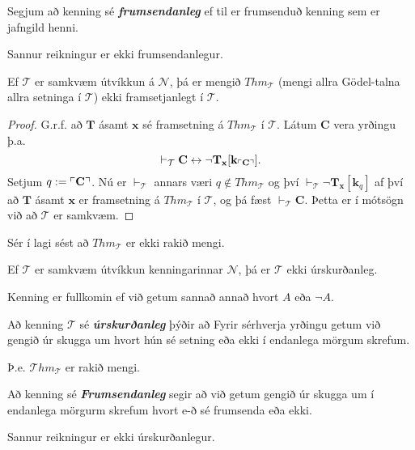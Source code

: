 \documentclass[12pt]{book}
\newcommand{\cT}{\mathcal{T}}
\newcommand{\cN}{\mathcal{N}}
\newcommand{\mc}[1]{\mathcal{#1}}
\newcommand{\bC}{\mathbf{C}}
\newcommand{\bT}{\mathbf{T}}
\newcommand{\bx}{\mathbf{x}}
\newcommand{\bk}{\mathbf{k}}
\newcommand{\Thm}{{\mc{T}hm}}
\newcommand{\vT}{\vdash_{\cT}}
\newcommand{\thT}{Thm_{\cT}}
\newcommand{\emphs}[1]{\textbf{\emph{#1}}}
\DeclarePairedDelimiter{\god}{\ulcorner}{\urcorner}
\begin{document}
\begin{skgr}
  Segjum að kenning sé \emphs{frumsendanleg} ef til er frumsenduð kenning sem
  er jafngild henni.

\end{skgr}

\begin{setn}[Fylgisetning]
 Sannur reikningur er ekki frumsendanlegur. 
\end{setn}

\begin{setn}[Hjálparsetning]
Ef $\cT$ er samkvæm útvíkkun á $\cN$, þá er mengið $Thm_{\cT}$ (mengi allra Gödel-talna allra setninga í $\cT$)
ekki framsetjanlegt í $\cT$.
\end{setn}

\begin{proof}
  G.r.f. að $\bT$ ásamt $\bx$ sé framsetning á $Thm_{\cT}$ í $\cT$.
  Látum $\bC$ vera yrðingu þ.a.
  \[\vdash_{\cT} \bC \leftrightarrow \lnot \bT_{\bx}[\bk_{\god{\bC}}]. \]
  Setjum $q:= \god{\bC}$. Nú er $\vdash_{\cT}$ annars væri
  $q \not\in Thm_{\cT}$ og því $\vT \lnot \bT_{\bx}[\bk_q]$ af því að
  $\bT$ ásamt $\bx$ er framsetning á $\thT$ í $\cT$,
  og þá fæst $\vT \bC$. Þetta er í mótsögn við að
  $\cT$ er samkvæm.

\end{proof}
Sér í lagi sést að $\thT$ er ekki rakið mengi.

\begin{setn}[Church] Ef $\cT$ er samkvæm útvíkkun kenningarinnar $\cN$,
  þá er $\cT$ ekki úrskurðanleg.
\end{setn}
\begin{skgr}
  Kenning er fullkomin ef við getum sannað annað hvort
 $A$ eða $\lnot A$.
\end{skgr}

\begin{skgr}
  Að kenning $\cT$ sé \emphs{úrskurðanleg} þýðir að
  Fyrir sérhverja yrðingu getum við gengið úr skugga um hvort
  hún sé setning eða ekki í endanlega mörgum skrefum.
  
  Þ.e. $\Thm_{\cT}$ er rakið mengi.

  Að kenning sé \emphs{Frumsendanleg} segir að við getum gengið úr skugga um í endanlega
  mörgurm skrefum hvort e-ð sé frumsenda eða ekki.

\end{skgr}
\begin{setn}
  Sannur reikningur er ekki úrskurðanlegur.
\end{setn}
\end{document}
